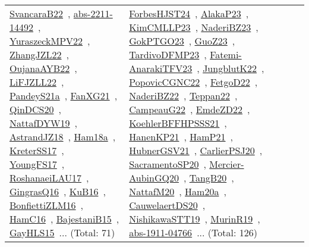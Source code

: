 {\begin{longtable}{lp{3cm}>{\raggedright\arraybackslash}p{6cm}>{\raggedright\arraybackslash}p{6cm}>{\raggedright\arraybackslash}p{8cm}}
\href{../works/SvancaraB22.pdf}{SvancaraB22}~\cite{SvancaraB22}, \href{../works/abs-2211-14492.pdf}{abs-2211-14492}~\cite{abs-2211-14492}, \href{../works/YuraszeckMPV22.pdf}{YuraszeckMPV22}~\cite{YuraszeckMPV22}, \href{../works/ZhangJZL22.pdf}{ZhangJZL22}~\cite{ZhangJZL22}, \href{../works/OujanaAYB22.pdf}{OujanaAYB22}~\cite{OujanaAYB22}, \href{../works/LiFJZLL22.pdf}{LiFJZLL22}~\cite{LiFJZLL22}, \href{../works/PandeyS21a.pdf}{PandeyS21a}~\cite{PandeyS21a}, \href{../works/FanXG21.pdf}{FanXG21}~\cite{FanXG21}, \href{../works/QinDCS20.pdf}{QinDCS20}~\cite{QinDCS20}, \href{../works/NattafDYW19.pdf}{NattafDYW19}~\cite{NattafDYW19}, \href{../works/AstrandJZ18.pdf}{AstrandJZ18}~\cite{AstrandJZ18}, \href{../works/Ham18a.pdf}{Ham18a}~\cite{Ham18a}, \href{../works/KreterSS17.pdf}{KreterSS17}~\cite{KreterSS17}, \href{../works/YoungFS17.pdf}{YoungFS17}~\cite{YoungFS17}, \href{../works/RoshanaeiLAU17.pdf}{RoshanaeiLAU17}~\cite{RoshanaeiLAU17}, \href{../works/GingrasQ16.pdf}{GingrasQ16}~\cite{GingrasQ16}, \href{../works/KuB16.pdf}{KuB16}~\cite{KuB16}, \href{../works/BonfiettiZLM16.pdf}{BonfiettiZLM16}~\cite{BonfiettiZLM16}, \href{../works/HamC16.pdf}{HamC16}~\cite{HamC16}, \href{../works/BajestaniB15.pdf}{BajestaniB15}~\cite{BajestaniB15}, \href{../works/GayHLS15.pdf}{GayHLS15}~\cite{GayHLS15}... (Total: 71) & \href{../works/ForbesHJST24.pdf}{ForbesHJST24}~\cite{ForbesHJST24}, \href{../works/AlakaP23.pdf}{AlakaP23}~\cite{AlakaP23}, \href{../works/KimCMLLP23.pdf}{KimCMLLP23}~\cite{KimCMLLP23}, \href{../works/NaderiBZ23.pdf}{NaderiBZ23}~\cite{NaderiBZ23}, \href{../works/GokPTGO23.pdf}{GokPTGO23}~\cite{GokPTGO23}, \href{../works/GuoZ23.pdf}{GuoZ23}~\cite{GuoZ23}, \href{../works/TardivoDFMP23.pdf}{TardivoDFMP23}~\cite{TardivoDFMP23}, \href{../works/Fatemi-AnarakiTFV23.pdf}{Fatemi-AnarakiTFV23}~\cite{Fatemi-AnarakiTFV23}, \href{../works/JungblutK22.pdf}{JungblutK22}~\cite{JungblutK22}, \href{../works/PopovicCGNC22.pdf}{PopovicCGNC22}~\cite{PopovicCGNC22}, \href{../works/FetgoD22.pdf}{FetgoD22}~\cite{FetgoD22}, \href{../works/NaderiBZ22.pdf}{NaderiBZ22}~\cite{NaderiBZ22}, \href{../works/Teppan22.pdf}{Teppan22}~\cite{Teppan22}, \href{../works/CampeauG22.pdf}{CampeauG22}~\cite{CampeauG22}, \href{../works/EmdeZD22.pdf}{EmdeZD22}~\cite{EmdeZD22}, \href{../works/KoehlerBFFHPSSS21.pdf}{KoehlerBFFHPSSS21}~\cite{KoehlerBFFHPSSS21}, \href{../works/HanenKP21.pdf}{HanenKP21}~\cite{HanenKP21}, \href{../works/HamP21.pdf}{HamP21}~\cite{HamP21}, \href{../works/HubnerGSV21.pdf}{HubnerGSV21}~\cite{HubnerGSV21}, \href{../works/CarlierPSJ20.pdf}{CarlierPSJ20}~\cite{CarlierPSJ20}, \href{../works/SacramentoSP20.pdf}{SacramentoSP20}~\cite{SacramentoSP20}, \href{../works/Mercier-AubinGQ20.pdf}{Mercier-AubinGQ20}~\cite{Mercier-AubinGQ20}, \href{../works/TangB20.pdf}{TangB20}~\cite{TangB20}, \href{../works/NattafM20.pdf}{NattafM20}~\cite{NattafM20}, \href{../works/Ham20a.pdf}{Ham20a}~\cite{Ham20a}, \href{../works/CauwelaertDS20.pdf}{CauwelaertDS20}~\cite{CauwelaertDS20}, \href{../works/NishikawaSTT19.pdf}{NishikawaSTT19}~\cite{NishikawaSTT19}, \href{../works/MurinR19.pdf}{MurinR19}~\cite{MurinR19}, \href{../works/abs-1911-04766.pdf}{abs-1911-04766}~\cite{abs-1911-04766}... (Total: 126)\\

\end{longtable}}
